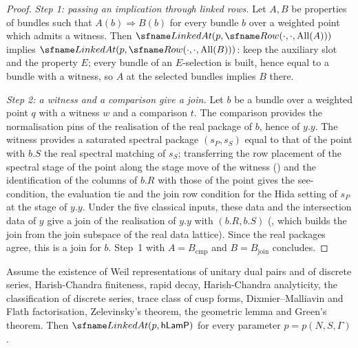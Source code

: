 \begin{proof}
\emph{Step 1: passing an implication through linked rows.} Let $A,B$ be properties of bundles such that $A(b)\Rightarrow
B(b)$ for every bundle $b$ over a weighted point which admits a witness. Then $\openzeroLinked(p,\openzeroRow(\cdot,\cdot,
\openzeroAll(A)))$ implies $\openzeroLinked(p,\openzeroRow(\cdot,\cdot,\openzeroAll(B)))$: keep the auxiliary slot and the
property $E$; every bundle of an $E$-selection is built, hence equal to a bundle with a witness, so $A$ at the selected
bundles implies $B$ there.

\emph{Step 2: a witness and a comparison give a join.} Let $b$ be a bundle over a weighted point $q$ with a witness $w$
and a comparison $t$. The comparison provides the normalisation pins of the realisation of the real package of $b$,
hence of $y.y$. The witness provides a saturated spectral package $(s_P,s_S)$ equal to that of the point with $b.S$ the
real spectral matching of $s_S$; transferring the row placement of the spectral stage of the point along the stage move
of the witness () and the
identification of the columns of $b.R$ with those of the point gives the see-condition, the evaluation tie and the
join row condition for the Hida setting of $s_P$ at the stage of $y.y$. Under the five classical inputs, these
data and the intersection data of $y$ give a join of the realisation of $y.y$ with $(b.R,b.S)$
(, which builds the join from the join subspace of the
real data lattice). Since the real packages agree, this is a join for $b$. Step~1 with $A=B_{\mathrm{cmp}}$ and
$B=B_{\mathrm{join}}$ concludes.
\end{proof}

\begin{proposition}\label{pf:open0:lam}
Assume the existence of Weil representations of unitary dual pairs and of discrete series, Harish-Chandra finiteness,
rapid decay, Harish-Chandra analyticity, the classification of discrete series, trace class of cusp forms,
Dixmier--Malliavin and Flath factorisation, Zelevinsky's theorem, the geometric lemma and Green's theorem. Then
$\openzeroLinked(p,\mathsf{hLamP})$ for every parameter $p=p(N,S,\Gamma)$.
\ \
\end{proposition}

